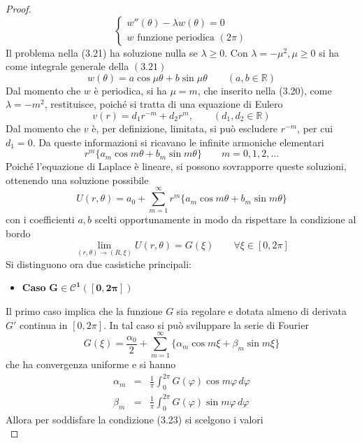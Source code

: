 \documentclass[a4paper,12pt, draft]{article}
\theoremstyle{break}
\let\phi\varphi
\numberwithin{equation}{section}
\begin{document}
\begin{proof}
\begin{equation}
    \begin{cases}
      w''(\theta) - \lambda w(\theta) = 0 \\
      w \mbox{ funzione periodica }(2\pi) 
    \end{cases}
  \end{equation}
  Il problema nella (3.21) ha soluzione nulla se \(\lambda \geq 0\). Con \(\lambda = -\mu^2, \mu \geq 0\) si ha come integrale generale della \((3.21)\)
  \[
    w(\theta) = a \cos{\mu\theta} + b \sin{\mu\theta} \qquad (a,b \in \mathbb{R})
  \]
  Dal momento che \(w\) è periodica, si ha \(\mu = m\), che inserito nella (3.20), come \(\lambda = -m^2\), restituisce, poiché si tratta di una equazione di Eulero
  \[
    v(r) = d_1r^{-m} + d_2r^{m}, \qquad (d_1, d_2 \in \mathbb{R})
  \]
  Dal momento che \(v\) è, per definizione, limitata, si può escludere \(r^{-m}\), per cui \(d_1 = 0\). Da queste informazioni si ricavano le infinite armoniche elementari
  \[
    r^m\{a_m \cos{m\theta} + b_m \sin{m\theta}\} \qquad m = 0, 1, 2, \ldots
  \] 
Poiché l'equazione di Laplace è lineare, si possono sovrapporre queste soluzioni, ottenendo una soluzione possibile
\begin{equation}
  U(r, \theta) = a_0 + \sum_{m=1}^{\infty} r^m \{a_m \cos{m\theta} + b_m \sin{m\theta}\}
\end{equation}
con i coefficienti \(a, b\) scelti opportunamente in modo da rispettare la condizione al bordo
\begin{equation}
  \lim_{(r,\theta) \to (R, \xi)} U(r, \theta) = G(\xi) \qquad \forall \xi \in [0, 2\pi]
\end{equation}
Si distinguono ora due casistiche principali:
\begin{itemize}
  \item \textbf{Caso} \(\bm{G \in \mathcal{C}^{1}([0, 2\pi])}\)
\end{itemize}
Il primo caso implica che la funzione \(G\) sia regolare e dotata almeno di derivata \(G'\) continua in \([0, 2\pi]\). In tal caso si può sviluppare la serie di Fourier
\[
  G(\xi) = \frac{\alpha_0}{2} + \sum_{m = 1}^{\infty} \{\alpha_m \cos{m\xi} + \beta_m \sin{m\xi} \}
\]
che ha convergenza uniforme e si hanno
\begin{eqnarray*}
  \alpha_m & = & \frac{1}{\pi} \int_0^{2\pi} G(\phi) \cos{m\phi} \, d\phi \\
  \beta_m & = & \frac{1}{\pi} \int_0^{2\pi} G(\phi) \sin{m\phi} \, d\phi
\end{eqnarray*}
Allora per soddisfare la condizione (3.23) si scelgono i valori
\[
\]
\end{proof}
\end{document}
